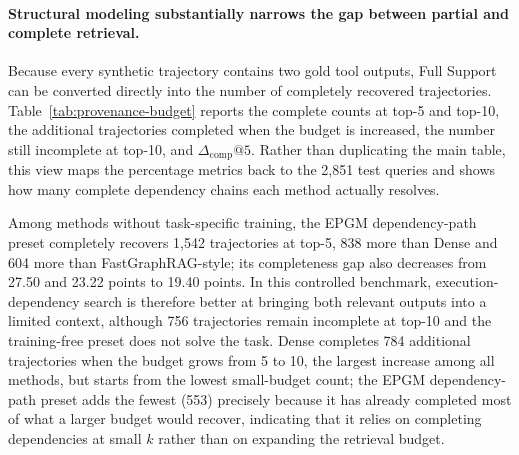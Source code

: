 \paragraph{Structural modeling substantially narrows the gap between
partial and complete retrieval.}
Because every synthetic trajectory contains two gold tool outputs, Full
Support can be converted directly into the number of completely recovered
trajectories. Table~\ref{tab:provenance-budget} reports the complete counts
at top-5 and top-10, the additional trajectories completed when the budget
is increased, the number still incomplete at top-10, and
$\Delta_{\mathrm{comp}}@5$. Rather than duplicating the main table, this
view maps the percentage metrics back to the 2,851 test queries and shows
how many complete dependency chains each method actually resolves.

\begin{table}[t]
\centering
\small
\setlength{\tabcolsep}{5pt}
\caption{Interim seed-13 complete-support and retrieval-budget diagnostics
on synthetic execution trajectories. Complete-count columns use 2,851 as
their denominator; the completeness gap is measured in percentage points.}
\label{tab:provenance-budget}
\end{table}

Among methods without task-specific training, the EPGM dependency-path
preset completely recovers 1,542 trajectories at top-5, 838 more than
Dense and 604 more than FastGraphRAG-style; its completeness gap also
decreases from 27.50 and 23.22 points to 19.40 points. In this controlled
benchmark, execution-dependency search is therefore better at bringing
both relevant outputs into a limited context, although
756 trajectories remain incomplete at top-10 and the training-free preset
does not solve the task. Dense completes 784 additional trajectories when
the budget grows from 5 to 10, the largest increase among all methods, but
starts from the lowest small-budget count; the EPGM dependency-path preset
adds the fewest (553) precisely because it has already completed most of
what a larger budget would recover, indicating that it relies on
completing dependencies at small $k$ rather than on expanding the
retrieval budget.

